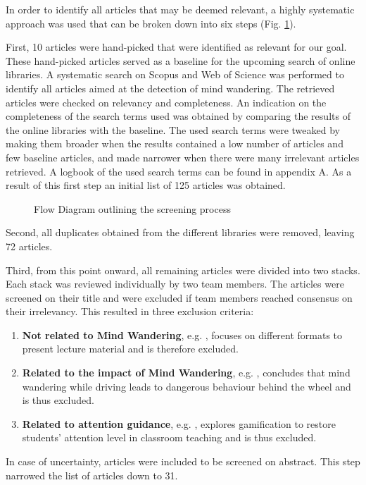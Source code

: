 
In order to identify all articles that may be deemed relevant, a highly systematic approach was used that can be broken down into six steps (Fig. \ref{fig:prisma}).

First, 10 articles were hand-picked that were identified as relevant for our goal. These hand-picked articles served as a baseline for the upcoming search of online libraries.
A systematic search on Scopus and Web of Science was performed to identify all articles aimed at the detection of mind wandering. The retrieved articles were checked on relevancy and completeness.
An indication on the completeness of the search terms used was obtained by comparing the results of the online libraries with the baseline. 
The used search terms were tweaked by making them broader when the results contained a low number of articles and few baseline articles, and made narrower when there were many irrelevant articles retrieved.
A logbook of the used search terms can be found in appendix A.
As a result of this first step an initial list of 125 articles was obtained.

\begin{figure}
  \resizebox{\columnwidth}{!}{}
\caption{Flow Diagram outlining the screening process}
\label{fig:prisma}
\end{figure}

Second, all duplicates obtained from the different libraries were removed, leaving 72 articles.

Third, from this point onward, all remaining articles were divided into two stacks. Each stack was reviewed individually by two team members.
The articles were screened on their title and were excluded if team members reached consensus on their irrelevancy. 
This resulted in three exclusion criteria:
\begin{enumerate}
    \item \textbf{Not related to Mind Wandering}, e.g. \cite{ISI:000432512400017}, focuses on different formats to present lecture material and is therefore excluded.
    \item \textbf{Related to the impact of Mind Wandering}, e.g. \cite{Albert2018LinkingDrivers}, concludes that mind wandering while driving leads to dangerous behaviour behind the wheel and is thus excluded.
    \item \textbf{Related to attention guidance}, e.g. \cite{Xiao2018ClassroomMechanism}, explores gamification to restore students' attention level in classroom teaching and is thus excluded.
  \end{enumerate}
In case of uncertainty, articles were included to be screened on abstract. This step narrowed the list of articles down to 31.

